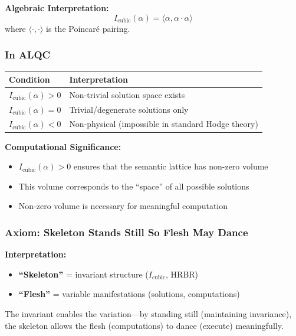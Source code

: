 \documentclass[11pt, letterpaper]{article}
\begin{document}
\textbf{Algebraic Interpretation:}
\begin{equation}
I_{\text{cubic}}(\alpha) = \langle \alpha, \alpha \cdot \alpha \rangle
\end{equation}
where $\langle \cdot, \cdot \rangle$ is the Poincaré pairing.

\subsubsection{In ALQC}

\begin{table}[h]
\centering
\begin{tabular}{ll}
\toprule
Condition & Interpretation \\
\midrule
$I_{\text{cubic}}(\alpha) > 0$ & Non-trivial solution space exists \\
$I_{\text{cubic}}(\alpha) = 0$ & Trivial/degenerate solutions only \\
$I_{\text{cubic}}(\alpha) < 0$ & Non-physical (impossible in standard Hodge theory) \\
\bottomrule
\end{tabular}
\end{table}

\textbf{Computational Significance:}
\begin{itemize}
    \item $I_{\text{cubic}}(\alpha) > 0$ ensures that the semantic lattice has non-zero volume
    \item This volume corresponds to the ``space'' of all possible solutions
    \item Non-zero volume is necessary for meaningful computation
\end{itemize}

\subsubsection{Axiom: Skeleton Stands Still So Flesh May Dance}

\textbf{Interpretation:}
\begin{itemize}
    \item \textbf{``Skeleton''} = invariant structure ($I_{\text{cubic}}$, HRBR)
    \item \textbf{``Flesh''} = variable manifestations (solutions, computations)
\end{itemize}

The invariant enables the variation—by standing still (maintaining invariance), the skeleton allows the flesh (computations) to dance (execute) meaningfully.
\end{document}
